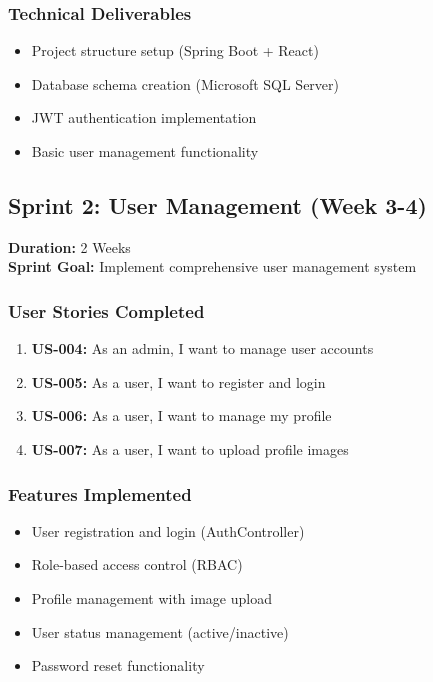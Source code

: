\documentclass[12pt,a4paper]{article}
\begin{document}
\subsubsection{Technical Deliverables}
\begin{itemize}
    \item Project structure setup (Spring Boot + React)
    \item Database schema creation (Microsoft SQL Server)
    \item JWT authentication implementation
    \item Basic user management functionality
\end{itemize}

\subsection{Sprint 2: User Management (Week 3-4)}
\textbf{Duration:} 2 Weeks \\
\textbf{Sprint Goal:} Implement comprehensive user management system

\subsubsection{User Stories Completed}
\begin{enumerate}
    \item \textbf{US-004:} As an admin, I want to manage user accounts
    \item \textbf{US-005:} As a user, I want to register and login
    \item \textbf{US-006:} As a user, I want to manage my profile
    \item \textbf{US-007:} As a user, I want to upload profile images
\end{enumerate}

\subsubsection{Features Implemented}
\begin{itemize}
    \item User registration and login (AuthController)
    \item Role-based access control (RBAC)
    \item Profile management with image upload
    \item User status management (active/inactive)
    \item Password reset functionality
\end{itemize}
\end{document}

